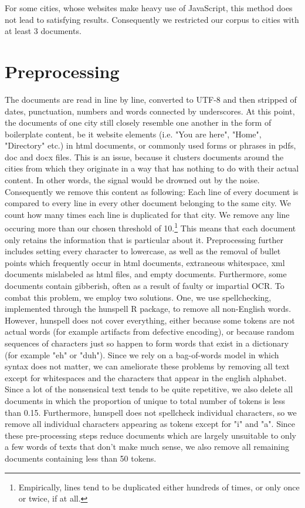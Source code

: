 \documentclass[11pt]{article}
\begin{document}


\begin{landscape}

\end{landscape}

For some cities, whose websites make heavy use of JavaScript, this method does not lead to satisfying results. Consequently we restricted our corpus to cities with at least 3 documents.

\section{Preprocessing}

The documents are read in line by line, converted to UTF-8 and then stripped of dates, punctuation, numbers and words connected by underscores. At this point, the documents of one city still closely resemble one another in the form of boilerplate content, be it website elements (i.e. "You are here", "Home", "Directory" etc.) in html documents, or commonly used forms or phrases in pdfs, doc and docx files. This is an issue, because it clusters documents around the cities from which they originate in a way that has nothing to do with their actual content. In other words, the signal would be drowned out by the noise. Consequently we remove this content as following: Each line of every document is compared to every line in every other document belonging to the same city. We count how many times each line is duplicated for that city. We remove any line occuring more than our chosen threshold of 10.\footnote{Empirically, lines tend to be duplicated either hundreds of times, or only once or twice, if at all.} This means that each document only retains the information that is particular about it.
Preprocessing further includes setting every character to lowercase, as well as the removal of bullet points which frequently occur in html documents, extraneous whitespace, xml documents mislabeled as html files, and empty documents. Furthermore, some documents contain gibberish, often as a result of faulty or impartial OCR. To combat this problem, we employ two solutions. One, we use spellchecking, implemented through the hunspell R package, to remove all non-English words. However, hunspell does not cover everything, either because some tokens are not actual words (for example artifacts from defective encoding), or because random sequences of characters just so happen to form words that exist in a dictionary (for example "eh" or "duh"). Since we rely on a bag-of-words model in which syntax does not matter, we can ameliorate these problems by removing all text except for whitespaces and the characters that appear in the english alphabet. Since a lot of the nonsensical text tends to be quite repetitive, we also delete all documents in which the proportion of unique to total number of tokens is less than 0.15. Furthermore, hunspell does not spellcheck individual characters, so we remove all individual characters appearing as tokens except for "i" and "a". Since these pre-processing steps reduce documents which are largely unsuitable to only a few words of texts that don't make much sense, we also remove all remaining documents containing less than 50 tokens.
\end{document}
